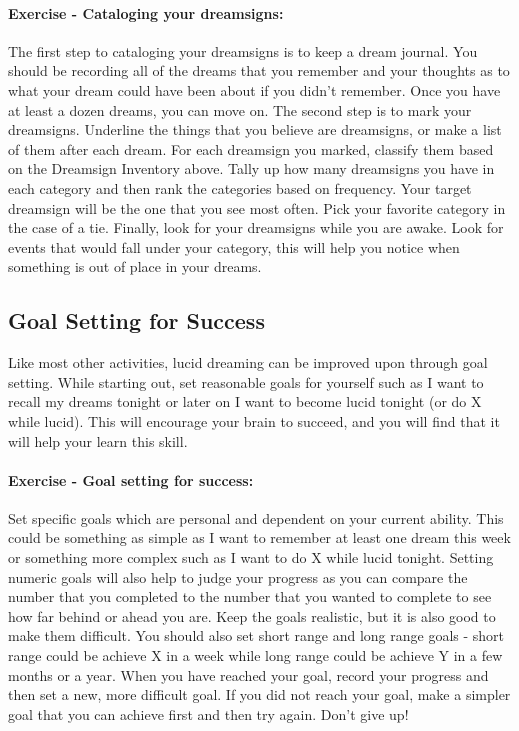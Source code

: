 \documentclass{article}
\begin{document}
\paragraph{Exercise - Cataloging your dreamsigns:} The first step to cataloging your dreamsigns is to keep a dream journal. You should be recording all of the dreams that you remember and your thoughts as to what your dream could have been about if you didn't remember. Once you have at least a dozen dreams, you can move on. The second step is to mark your dreamsigns. Underline the things that you believe are dreamsigns, or make a list of them after each dream. For each dreamsign you marked, classify them based on the Dreamsign Inventory above. Tally up how many dreamsigns you have in each category and then rank the categories based on frequency. Your target dreamsign will be the one that you see most often. Pick your favorite category in the case of a tie. Finally, look for your dreamsigns while you are awake. Look for events that would fall under your category, this will help you notice when something is out of place in your dreams.

\subsection{Goal Setting for Success}
Like most other activities, lucid dreaming can be improved upon through goal setting. While starting out, set reasonable goals for yourself such as I want to recall my dreams tonight or later on I want to become lucid tonight (or do X while lucid). This will encourage your brain to succeed, and you will find that it will help your learn this skill.

\paragraph{Exercise - Goal setting for success:} Set specific goals which are personal and dependent on your current ability. This could be something as simple as I want to remember at least one dream this week or something more complex such as I want to do X while lucid tonight. Setting numeric goals will also help to judge your progress as you can compare the number that you completed to the number that you wanted to complete to see how far behind or ahead you are. Keep the goals realistic, but it is also good to make them difficult. You should also set short range and long range goals - short range could be achieve X in a week while long range could be achieve Y in a few months or a year. When you have reached your goal, record your progress and then set a new, more difficult goal. If you did not reach your goal, make a simpler goal that you can achieve first and then try again. Don't give up!
\end{document}
